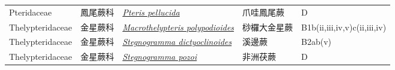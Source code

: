 {\begin{longtable}{L{2.5cm}L{2cm}L{5cm}L{2.5cm}L{3cm}}
    Pteridaceae & 鳳尾蕨科 & \href{http://www.theplantlist.org/tpl1.1/search?q=Pteris+pellucida}{\textit{Pteris pellucida} } & 爪哇鳳尾蕨 & D    \\
    Thelypteridaceae & 金星蕨科 & \href{http://www.theplantlist.org/tpl1.1/search?q=Macrothelypteris+polypodioides}{\textit{Macrothelypteris polypodioides} } & 桫欏大金星蕨 & B1b(ii,iii,iv,v)c(ii,iii,iv)    \\
    Thelypteridaceae & 金星蕨科 & \href{http://www.theplantlist.org/tpl1.1/search?q=Stegnogramma+dictyoclinoides}{\textit{Stegnogramma dictyoclinoides} } & 溪邊蕨 & B2ab(v)    \\
    Thelypteridaceae & 金星蕨科 & \href{http://www.theplantlist.org/tpl1.1/search?q=Stegnogramma+pozoi}{\textit{Stegnogramma pozoi} } & 非洲茯蕨 & D    \\
    \bottomrule
        \end{longtable}
        }
    